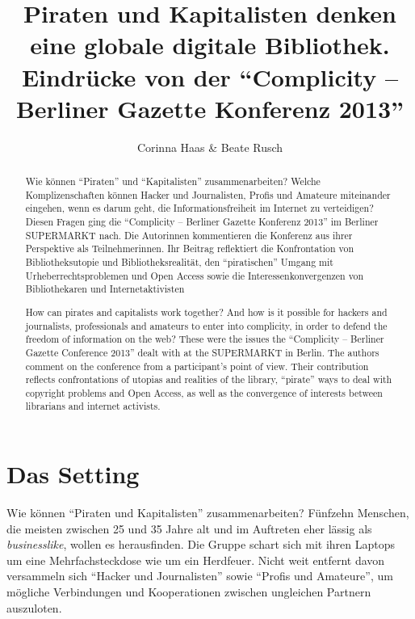 \documentclass[a4paper,
fontsize=11pt,
oneside,
numbers=noperiodatend,
parskip=half-,
bibliography=totoc,
final
]{scrartcl}
\title{\LARGE{Piraten und Kapitalisten denken eine globale digitale Bibliothek. Eindrücke von der \enquote{Complicity – Berliner Gazette Konferenz 2013}}} %
\author{Corinna Haas \& Beate Rusch} %
\date{}
\begin{document}
\maketitle
\thispagestyle{fancyplain} 



\begin{center}
\end{center}

\begin{abstract}
\small
Wie können \enquote{Piraten} und \enquote{Kapitalisten} zusammenarbeiten? Welche Komplizenschaften können Hacker und Journalisten, Profis und Amateure miteinander eingehen, wenn es darum geht, die Informationsfreiheit im Internet zu verteidigen? Diesen Fragen ging die \enquote{Complicity – Berliner Gazette Konferenz 2013} im Berliner SUPERMARKT nach. Die Autorinnen kommentieren die Konferenz aus ihrer Perspektive als Teilnehmerinnen. Ihr Beitrag reflektiert die Konfrontation von Bibliotheksutopie und Bibliotheksrealität, den \enquote{piratischen} Umgang mit Urheberrechtsproblemen und Open Access sowie die Interessenkonvergenzen von Bibliothekaren und Internetaktivisten
\end{abstract}

\begin{abstract}
\small
How can pirates and capitalists work together? And how is it possible for hackers and journalists, professionals and amateurs to enter into complicity, in order to defend the freedom of information on the web? These were the issues the \enquote{Complicity – Berliner Gazette Conference 2013} dealt with at the SUPERMARKT in Berlin. The authors comment on the conference from a participant’s point of view. Their contribution reflects confrontations of utopias and realities of the library, \enquote{pirate} ways to deal with copyright problems and Open Access, as well as the convergence of interests between librarians and internet activists.
\end{abstract}


\section*{Das Setting}\label{das-setting}

Wie können \enquote{Piraten und Kapitalisten} zusammenarbeiten? Fünfzehn
Menschen, die meisten zwischen 25 und 35 Jahre alt und im Auftreten eher
lässig als \emph{businesslike}, wollen es herausfinden. Die Gruppe
schart sich mit ihren Laptops um eine Mehrfachsteckdose wie um ein
Herdfeuer. Nicht weit entfernt davon versammeln sich \enquote{Hacker und
Journalisten} sowie \enquote{Profis und Amateure}, um mögliche
Verbindungen und Kooperationen zwischen ungleichen Partnern auszuloten.
\end{document}
